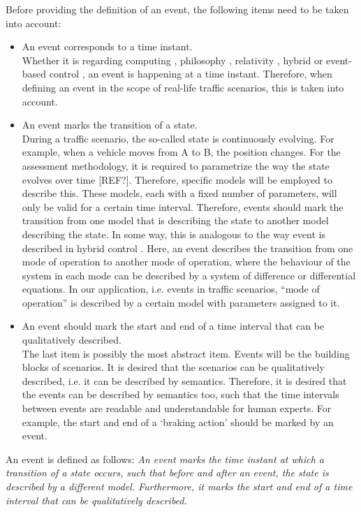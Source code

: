 Before providing the definition of an event, the following items need to be taken into account:
\begin{itemize}
	\item An event corresponds to a time instant.\\
	Whether it is regarding computing \cite{breu1997towards}, philosophy \cite{kim1993supervenience}, relativity \cite{sartori1996understanding}, hybrid or event-based control \cite{branicky1998hybridcontrol, deschutter2003hybrid, heemels2012eventcontrol}, an event is happening at a time instant. Therefore, when defining an event in the scope of real-life traffic scenarios, this is taken into account.
	
	\item An event marks the transition of a state.\\
	During a traffic scenario, the so-called state is continuously evolving. For example, when a vehicle moves from A to B, the position changes. For the assessment methodology, it is required to parametrize the way the state evolves over time [REF?]. Therefore, specific models will be employed to describe this. These models, each with a fixed number of parameters, will only be valid for a certain time interval. Therefore, events should mark the transition from one model that is describing the state to another model describing the state. In some way, this is analogous to the way event is described in hybrid control \cite{deschutter2003hybrid}. Here, an event describes the transition from one mode of operation to another mode of operation, where the behaviour of the system in each mode can be described by a system of difference or differential equations. In our application, i.e. events in traffic scenarios, ``mode of operation'' is described by a certain model with parameters assigned to it.
	
	\item An event should mark the start and end of a time interval that can be qualitatively described.\\
	The last item is possibly the most abstract item. Events will be the building blocks of scenarios. It is desired that the scenarios can be qualitatively described, i.e. it can be described by semantics. Therefore, it is desired that the events can be described by semantics too, such that the time intervals between events are readable and understandable for human experts. For example, the start and end of a `braking action' should be marked by an event. 
\end{itemize}

An event is defined as follows: \emph{An event marks the time instant at which a transition of a state occurs, such that before and after an event, the state is described by a different model. Furthermore, it marks the start and end of a time interval that can be qualitatively described.}
